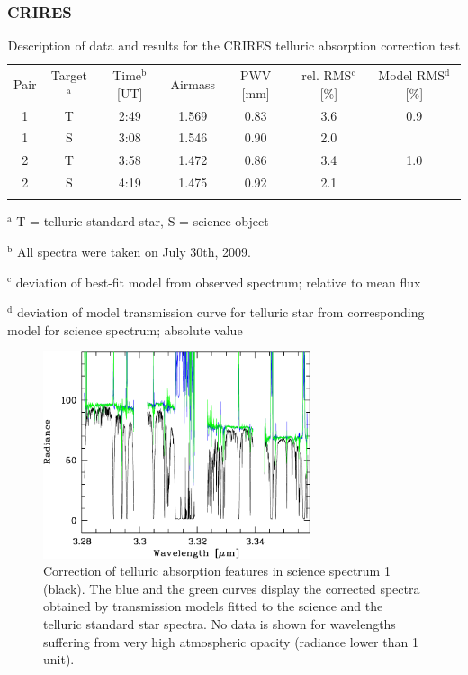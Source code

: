 \subsubsection{CRIRES}\label{sec:crires}
\begin{table}
\caption[]{Description of data and results for the CRIRES telluric absorption
correction test}
\label{tab:tactest}
\centering
\vspace{5pt}
\begin{tabular}{c c c c c c c}
\hline\hline
\noalign{\smallskip}
Pair & Target$^\mathrm{a}$ & Time$^\mathrm{b}$ [UT] & Airmass & PWV [mm] &
rel. RMS$^\mathrm{c}$ [\%] & Model RMS$^\mathrm{d}$ [\%] \\
\noalign{\smallskip}
\hline
\noalign{\smallskip}
1 & T & 2:49 & 1.569 & 0.83 & 3.6 & 0.9 \\
1 & S & 3:08 & 1.546 & 0.90 & 2.0 &     \\
2 & T & 3:58 & 1.472 & 0.86 & 3.4 & 1.0 \\
2 & S & 4:19 & 1.475 & 0.92 & 2.1 &     \\
\noalign{\smallskip}
\hline
\end{tabular}
\begin{list}{}{}
\item[$^\mathrm{a}$] T = telluric standard star, S = science object
\item[$^\mathrm{b}$] All spectra were taken on July 30th, 2009.
\item[$^\mathrm{c}$] deviation of best-fit model from observed spectrum;
relative to mean flux
\item[$^\mathrm{d}$] deviation of model transmission curve for telluric star
from corresponding model for science spectrum; absolute value
\end{list}
\end{table}

\begin{figure}
\centering
\includegraphics[width=0.7\textwidth,clip=true]
{figures/mfd_tactest1.pdf}
\caption[]{Correction of telluric absorption features in science spectrum 1
(black). The blue and the green curves display the corrected spectra obtained
by transmission models fitted to the science and the telluric standard star
spectra. No data is shown for wavelengths suffering from very high atmospheric
opacity (radiance lower than 1 unit).}
\label{fig:tactest1}
\end{figure}

